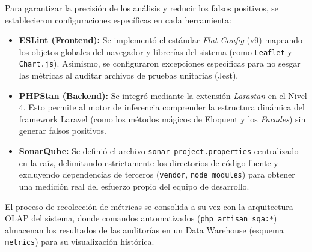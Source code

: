 Para garantizar la precisión de los análisis y reducir los falsos positivos, se establecieron configuraciones específicas en cada herramienta:

\begin{itemize}
    \item \textbf{ESLint (Frontend):} Se implementó el estándar \textit{Flat Config} (v9) mapeando los objetos globales del navegador y librerías del sistema (como \texttt{Leaflet} y \texttt{Chart.js}). Asimismo, se configuraron excepciones específicas para no sesgar las métricas al auditar archivos de pruebas unitarias (Jest).
    \item \textbf{PHPStan (Backend):} Se integró mediante la extensión \textit{Larastan} en el Nivel 4. Esto permite al motor de inferencia comprender la estructura dinámica del framework Laravel (como los métodos mágicos de Eloquent y los \textit{Facades}) sin generar falsos positivos.
    \item \textbf{SonarQube:} Se definió el archivo \texttt{sonar-project.properties} centralizado en la raíz, delimitando estrictamente los directorios de código fuente y excluyendo dependencias de terceros (\texttt{vendor}, \texttt{node\_modules}) para obtener una medición real del esfuerzo propio del equipo de desarrollo.
\end{itemize}

El proceso de recolección de métricas se consolida a su vez con la arquitectura OLAP del sistema, donde comandos automatizados (\texttt{php artisan sqa:*}) almacenan los resultados de las auditorías en un Data Warehouse (esquema \texttt{metrics}) para su visualización histórica.

